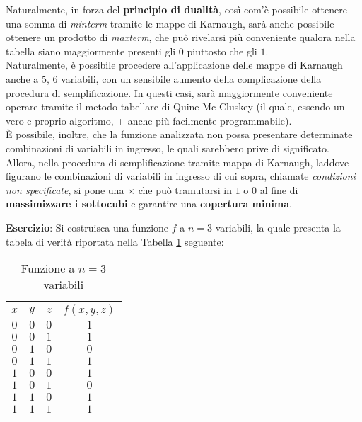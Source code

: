 \documentclass[a4paper]{extarticle}
\renewcommand\arraystretch{}
\begin{document}
Naturalmente, in forza del \textbf{principio di dualità}, così com'è possibile ottenere una somma di \textit{minterm} tramite le mappe di Karnaugh, sarà anche possibile ottenere un prodotto di \textit{maxterm}, che può rivelarsi più conveniente qualora nella tabella siano maggiormente presenti gli \(0\) piuttosto che gli \(1\).\\
Naturalmente, è possibile procedere all'applicazione delle mappe di Karnaugh anche a \(5\), \(6\) variabili, con un sensibile aumento della complicazione della procedura di semplificazione. In questi casi, sarà maggiormente conveniente operare tramite il metodo tabellare di Quine-Mc Cluskey (il quale, essendo un vero e proprio algoritmo, + anche più facilmente programmabile).\\
È possibile, inoltre, che la funzione analizzata non possa presentare determinate combinazioni di variabili in ingresso, le quali sarebbero prive di significato. Allora, nella procedura di semplificazione tramite mappa di Karnaugh, laddove figurano le combinazioni di variabili in ingresso di cui sopra, chiamate \emph{condizioni non specificate}, si pone una \(\times\) che può tramutarsi in \(1\) o \(0\) al fine di \textbf{massimizzare i sottocubi} e garantire una \textbf{copertura minima}.

\newpage
\noindent
\textbf{Esercizio}: Si costruisca una funzione \(f\) a \(n = 3\) variabili, la quale presenta la tabela di verità riportata nella Tabella \ref{tab:funzione_3_variabili_0} seguente:

\begin{table}[H]
    \centering
    \setlength{\tabcolsep}{8pt}
    \renewcommand{\arraystretch}{1.2}
    \begin{tabular}{ccc|c}
      $x$ & $y$ & $z$ & $f(x, y, z)$\\
      \hline
      $0$ & $0$ & $0$ & $1$\\
      $0$ & $0$ & $1$ & $1$\\
      $0$ & $1$ & $0$ & $0$\\
      $0$ & $1$ & $1$ & $1$\\
      $1$ & $0$ & $0$ & $1$\\
      $1$ & $0$ & $1$ & $0$\\
      $1$ & $1$ & $0$ & $1$\\
      $1$ & $1$ & $1$ & $1$\\
    \end{tabular}
    \caption{Funzione a \(n = 3\) variabili}
    \label{tab:funzione_3_variabili_0}
\end{table}
\end{document}
